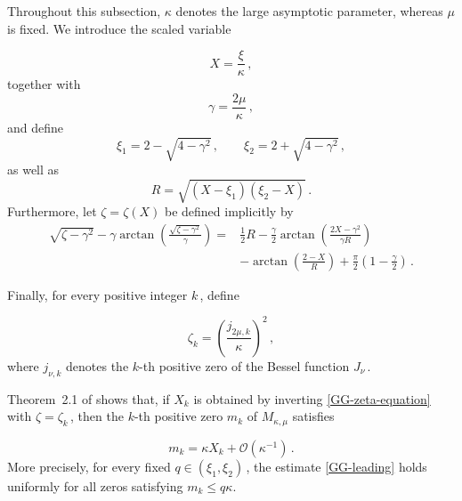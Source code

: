 \documentclass[11pt]{amsart}
\numberwithin{equation}{section}
\theoremstyle{remark}
\newcommand{\mn}{\medskip\noindent}
\begin{document}
\mn
Throughout this subsection, $\kappa$ denotes the large asymptotic
parameter, whereas $\mu$ is fixed. We introduce the scaled variable

\begin{equation}\label{scaled-variable}
X=\frac{\xi}{\kappa}\,,
\end{equation}
together with
\begin{equation}\label{gamma-def}
\gamma=\frac{2\mu}{\kappa}\,,
\end{equation}
and define
\begin{equation}\label{turning-points}
\xi_1=2-\sqrt{4-\gamma^2}\,,
\qquad
\xi_2=2+\sqrt{4-\gamma^2}\,,
\end{equation}
as well as
\begin{equation}\label{R-def}
R=\sqrt{(X-\xi_1)(\xi_2-X)}\,.
\end{equation}
Furthermore, let $\zeta=\zeta(X)$ be defined implicitly by
\begin{equation}\label{GG-zeta-equation}
\begin{aligned}
\sqrt{\zeta-\gamma^2}
-\gamma
\arctan\left(
\frac{\sqrt{\zeta-\gamma^2}}{\gamma}
\right)
={}&
\frac12R
-\frac{\gamma}{2}
\arctan\left(
\frac{2X-\gamma^2}{\gamma R}
\right)
\\
&
-\arctan\left(
\frac{2-X}{R}
\right)
+
\frac{\pi}{2}
\left(
1-\frac{\gamma}{2}
\right)\,.
\end{aligned}
\end{equation}

\mn
Finally, for every positive integer \(k\,\), define

\begin{equation}\label{zeta-k}
\zeta_k=
\left(
\frac{j_{2\mu,k}}{\kappa}
\right)^2\,,
\end{equation}
where \(j_{\nu,k}\) denotes the \(k\)-th positive zero of the Bessel
function \(J_\nu\)\,.

\mn
Theorem~2.1 of \cite{GG2001} shows that, if \(X_k\) is obtained by
inverting \eqref{GG-zeta-equation} with
\(\zeta=\zeta_k\,\), then the \(k\)-th positive zero
\(m_k\) of \(M_{\kappa,\mu}\) satisfies

\begin{equation}\label{GG-leading}
m_k=\kappa X_k+\mathcal O(\kappa^{-1})\,.
\end{equation}
More precisely, for every fixed \(q\in(\xi_1,\xi_2)\)\,, the estimate
\eqref{GG-leading} holds uniformly for all zeros satisfying
\(m_k\le q\kappa\).
%
\end{document}
